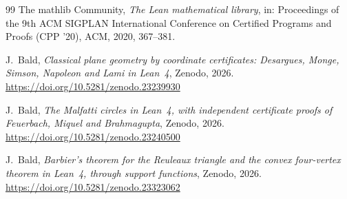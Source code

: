 \documentclass[11pt]{article}
\theoremstyle{definition}
\theoremstyle{remark}
\begin{document}
\begin{thebibliography}{99}
The mathlib Community,
\emph{The Lean mathematical library},
in: Proceedings of the 9th ACM SIGPLAN International Conference on Certified Programs and Proofs (CPP '20), ACM, 2020, 367--381.

J.~Bald,
\emph{Classical plane geometry by coordinate certificates: Desargues, Monge, Simson, Napoleon and Lami in Lean~4},
Zenodo, 2026. \url{https://doi.org/10.5281/zenodo.23239930}

J.~Bald,
\emph{The Malfatti circles in Lean~4, with independent certificate proofs of Feuerbach, Miquel and Brahmagupta},
Zenodo, 2026. \url{https://doi.org/10.5281/zenodo.23240500}

J.~Bald,
\emph{Barbier's theorem for the Reuleaux triangle and the convex four-vertex theorem in Lean~4, through support functions},
Zenodo, 2026. \url{https://doi.org/10.5281/zenodo.23323062}

\end{thebibliography}
\end{document}
